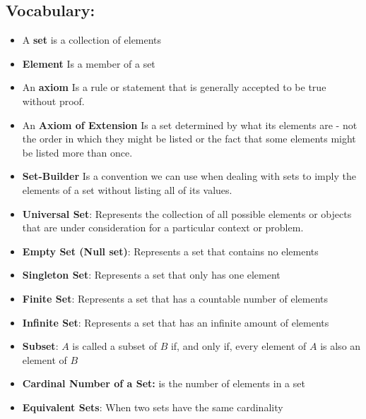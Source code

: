 \documentclass{report}
\begin{document}
      \subsection{Vocabulary:}
      \begin{itemize}
        \item A \textbf{set} is a collection of elements 
        \item \textbf{Element} Is a member of a set
        \item An \textbf{axiom} Is a rule or statement that is generally accepted to be true without proof.
        \item An \textbf{Axiom of Extension} Is a set determined by what its elements are - not the order in which they might be listed or the fact that some elements might be listed more than once.
        \item \textbf{Set-Builder} Is a convention we can use when dealing with sets to imply the elements of a set without listing all of its values.
        \item \textbf{Universal Set}: Represents the collection of all possible elements or objects that are under consideration for a particular context or problem.
        \item \textbf{Empty Set (Null set)}: Represents a set that contains no elements
        \item \textbf{Singleton Set}: Represents a set that only has one element
        \item \textbf{Finite Set}: Represents a set that has a countable number of elements
        \item \textbf{Infinite Set}: Represents a set that has an infinite amount of elements
        \item \textbf{Subset}: $A $ is called a subset of $B $ if, and only if, every element of $A $ is also an element of $B$
        \item \textbf{Cardinal Number of a Set:} is the number of elements in a set
        \item \textbf{Equivalent Sets}: When two sets have the same cardinality
      \end{itemize}

      \pagebreak \bigbreak \noindent 
\end{document}

